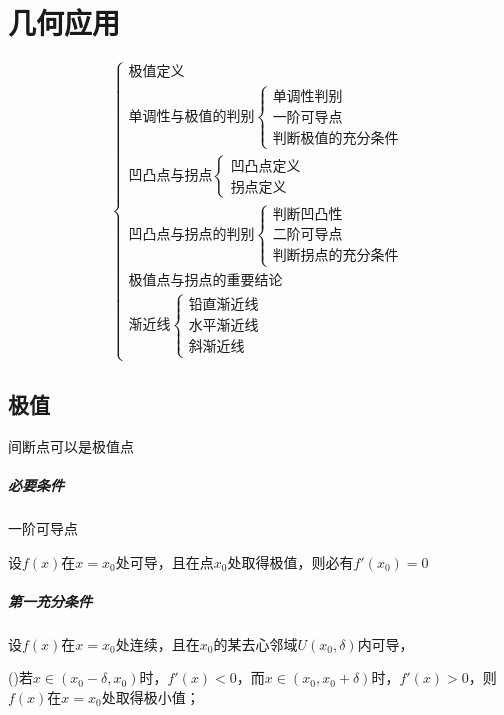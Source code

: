 
\chapter{几何应用}
\[\begin{cases}
\text{极值定义} \\ 
\text{单调性与极值的判别}\begin{cases}
\text{单调性判别} \\ 
\text{一阶可导点} \\ 
\text{判断极值的充分条件}\end{cases} \\ 
\text{凹凸点与拐点}\begin{cases}
\text{凹凸点定义} \\ 
\text{拐点定义}\end{cases} \\ 
\text{凹凸点与拐点的判别}\begin{cases}
\text{判断凹凸性} \\ 
\text{二阶可导点} \\ 
\text{判断拐点的充分条件}\end{cases} \\ 
\text{极值点与拐点的重要结论} \\ 
\text{渐近线}\begin{cases}
\text{铅直渐近线} \\ 
\text{水平渐近线} \\ 
\text{斜渐近线}\end{cases}
\end{cases}\]

\section{极值}

间断点可以是极值点

\paragraph{必要条件}
一阶可导点

设\(f(x)\)在\(x = x_0\)处可导，且在点\(x_0\)处取得极值，则必有\(f'(x_0) = 0\)

\paragraph{第一充分条件}
设\(f(x)\)在\(x = x_0\)处连续，且在\(x_0\)的某去心邻域\(U(x_0, \delta)\)内可导，

()若\(x \in (x_0 - \delta, x_0)\)时，\(f'(x) < 0\)，而\(x \in (x_0, x_0 + \delta)\)时，\(f'(x) > 0\)，则\(f(x)\)在\(x = x_0\)处取得极小值；

